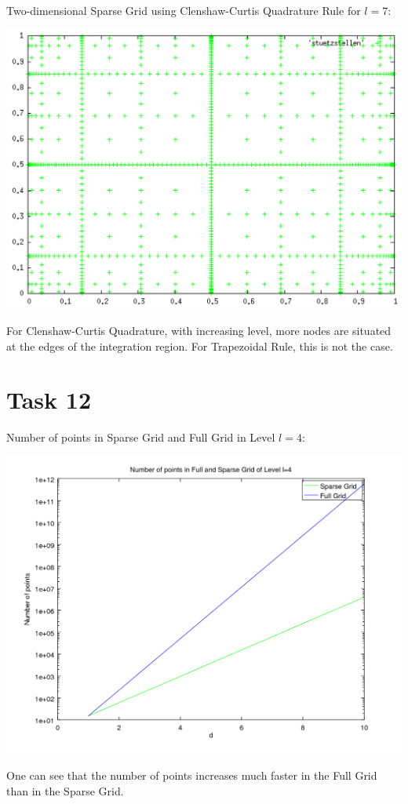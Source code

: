 \documentclass[10pt,a4paper]{article}
\begin{document}
Two-dimensional Sparse Grid using Clenshaw-Curtis Quadrature Rule for $l=7$:
\begin{center}
\includegraphics[scale=0.5]{clenshaw_curtis_l7.png}	
\end{center}
For Clenshaw-Curtis Quadrature, with increasing level, more nodes are situated at the edges of the integration region. For Trapezoidal Rule, this is not the case.

\newpage
\section*{Task 12}

Number of points in Sparse Grid and Full Grid in Level $l=4$:
\begin{center}
\includegraphics[scale=0.5]{number_of_points_SG_FG.png}
\end{center}
One can see that the number of points increases much faster in the Full Grid than in the Sparse Grid.
\end{document}
